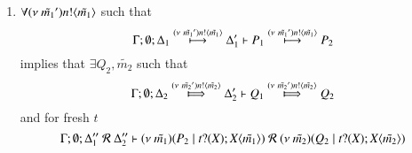 \begin{definition}[Bisimulation]
\begin{enumerate}

		\item	$\forall \news{\tilde{m_1}'} \bactout{n}{\tilde{m_1}}$ such that
			\[
				\horel{\Gamma}{\Delta_1}{P_1}{\hby{\news{\tilde{m_1}'} \bactout{n}{\tilde{m_1}}}}{\Delta_1'}{P_2}
			\]
			implies that $\exists Q_2, \tilde{m_2}$ such that
			\[
				\horel{\Gamma}{\Delta_2}{Q_1}{\Hby{\news{\tilde{m_2}'} \bactout{n}{\tilde{m_2}}}}{\Delta_2'}{Q_2}
			\]
			and for fresh $t$
			\[
				\horel{\Gamma}{\Delta_1''}{\newsp{\tilde{m_1}}{P_2 \Par \fotrigger{t}{\tilde{m_1}}}}{\ \mathcal{R}\ }{\Delta_2''}{\newsp{\tilde{m_2}}{Q_2 \Par \fotrigger{t}{\tilde{m_2}}}}
			\]


\end{enumerate}
\end{definition}
